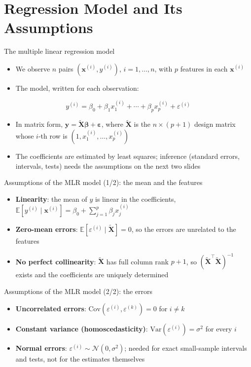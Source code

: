 \section{Regression Model and Its Assumptions}


\begin{frame}{The multiple linear regression model}
    \begin{itemize}
        \item We observe $n$ pairs $(\mathbf{x}^{(i)}, y^{(i)})$, $i = 1, \dots, n$, with $p$ features in each $\mathbf{x}^{(i)}$
        \item The model, written for each observation:
    \end{itemize}
    \[
        y^{(i)} = \beta_0 + \beta_1 x_1^{(i)} + \cdots + \beta_p x_p^{(i)} + \varepsilon^{(i)}
    \]
    \begin{itemize}
        \item In matrix form, $\mathbf{y} = \tilde{\mathbf{X}}\symbf{\beta} + \symbf{\varepsilon}$, where $\tilde{\mathbf{X}}$ is the $n \times (p+1)$ design matrix whose $i$-th row is $(1, x_1^{(i)}, \dots, x_p^{(i)})$
        \item The coefficients are estimated by least squares; inference (standard errors, intervals, tests) needs the assumptions on the next two slides
    \end{itemize}
\end{frame}


\begin{frame}{Assumptions of the MLR model (1/2): the mean and the features}
    \begin{itemize}
        \item \textbf{Linearity}: the mean of $y$ is linear in the coefficients, $\mathbb{E}[y^{(i)} \mid \mathbf{x}^{(i)}] = \beta_0 + \sum_{j=1}^{p} \beta_j x_j^{(i)}$
        \item \textbf{Zero-mean errors}: $\mathbb{E}[\varepsilon^{(i)} \mid \tilde{\mathbf{X}}] = 0$, so the errors are unrelated to the features
        \item \textbf{No perfect collinearity}: $\tilde{\mathbf{X}}$ has full column rank $p+1$, so $(\tilde{\mathbf{X}}^\top \tilde{\mathbf{X}})^{-1}$ exists and the coefficients are uniquely determined
    \end{itemize}
\end{frame}


\begin{frame}{Assumptions of the MLR model (2/2): the errors}
    \begin{itemize}
        \item \textbf{Uncorrelated errors}: $\mathrm{Cov}(\varepsilon^{(i)}, \varepsilon^{(k)}) = 0$ for $i \neq k$
        \item \textbf{Constant variance (homoscedasticity)}: $\mathrm{Var}(\varepsilon^{(i)}) = \sigma^2$ for every $i$
        \item \textbf{Normal errors}: $\varepsilon^{(i)} \sim \mathcal{N}(0, \sigma^2)$; needed for exact small-sample intervals and tests, not for the estimates themselves
    \end{itemize}
\end{frame}


